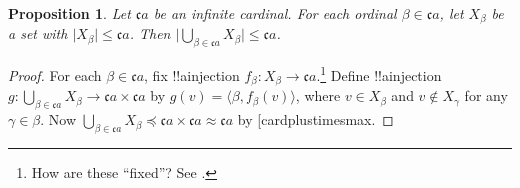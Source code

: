 \documentclass[10pt,a4paper]{article}
\makeatletter
\theoremstyle{plain}
\newtheorem{prop}[thm]{Proposition}
\theoremstyle{definition}
\theoremstyle{remark}
\newcommand*{\ollabel}[1]{\label{#1}}
\newcommand{\olref}{\@ifnextchar[{\olref@i}{\olref@final}}
\def\olref@i[#1]{\@ifnextchar[{\olref@ii}{\olref@final}}
\def\olref@ii[#1]{\@ifnextchar[{\olref@iii}{\olref@final}}
\def\olref@iii[#1]{\olref@final}
\def\olref@final#1{\ref{#1}}
\providecommand{\tuple}[1]{\langle #1 \rangle}
\providecommand{\card}[1]{\lvert #1 \rvert}
\providecommand{\cardfont}{\mathfrak{c}}
\makeatother
\begin{document}
\begin{prop}\ollabel{kappaunionkappasize}
Let $\cardfont{a}$ be an infinite cardinal. For each ordinal $\beta
\in \cardfont{a}$, let $X_\beta$ be a set with $\card{X_\beta} \leq
\cardfont{a}$. Then $\card{\bigcup_{\beta \in \cardfont{a}} X_\beta}
\leq \cardfont{a}$.
\end{prop}

\begin{proof}
For each $\beta \in \cardfont{a}$, fix !!a{injection} $f_\beta \colon
X_\beta \to \cardfont{a}$.\footnote{How are these ``fixed''? See \olref[sth][choice][countablechoice]{sec}.} Define !!a{injection} $g \colon
\bigcup_{\beta \in \cardfont{a}} X_\beta \to \cardfont{a} \times
\cardfont{a}$ by $g(v) = \tuple{\beta, f_\beta(v)}$, where $v \in
X_\beta$ and $v \notin X_\gamma$ for any $\gamma \in \beta$. Now
$\bigcup_{\beta \in \cardfont{a}} X_\beta \preceq \cardfont{a} \times
\cardfont{a} \approx \cardfont{a}$ by \olref{cardplustimesmax}.
\end{proof}
\end{document}
